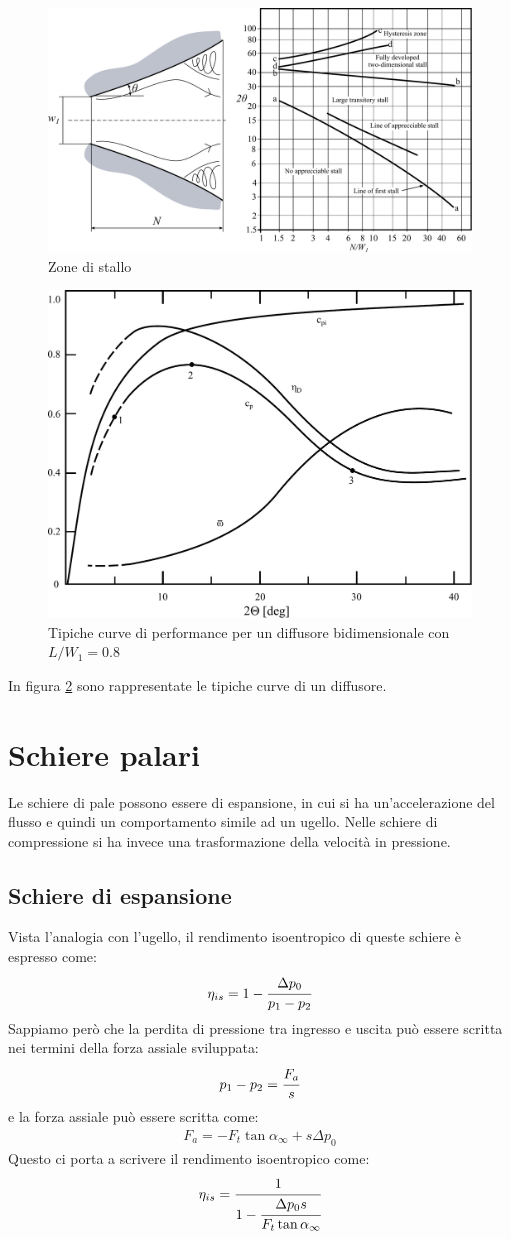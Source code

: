 \begin{figure}
\centering
  \includegraphics[width=.7\textwidth]{fig/stallo.pdf}
\caption{Zone di stallo}
\label{fig:stallo}
\end{figure}
\begin{figure}
\centering
  \includegraphics[width=.5\textwidth]{fig/DiffPerf.pdf}
\caption{Tipiche curve di performance per un diffusore bidimensionale con $L/W_1 = 0.8$}
\label{fig:DiffPerf}
\end{figure}
In figura \ref{fig:DiffPerf} sono rappresentate le tipiche curve di un diffusore.

\section{Schiere palari}
Le schiere di pale possono essere di espansione, in cui si ha un'accelerazione del flusso e quindi un comportamento simile ad un ugello. Nelle schiere di compressione si ha invece una trasformazione della velocità in pressione. 

\subsection{Schiere di espansione}
Vista l'analogia con l'ugello, il rendimento isoentropico di queste schiere è espresso come:
\begin{align*}
\eta_{is} = 1- \cfrac{\Delta p_0}{p_1 - p_2}
\end{align*}
Sappiamo però che la perdita di pressione tra ingresso e uscita può essere scritta nei termini della forza assiale sviluppata:
\begin{align*}
p_1-p_2 = \cfrac{F_a}{s}
\end{align*}
e la forza assiale può essere scritta come:
\begin{align*}
F_a=  - F_t \tan \alpha_{\infty} + s \Delta p_0
\end{align*}
Questo ci porta a scrivere il rendimento isoentropico come:
\begin{align*}
\eta_{is} = \cfrac{1}{1- \cfrac{\Delta p_0 s}{F_t \tan \alpha_{\infty}}}
\end{align*}
